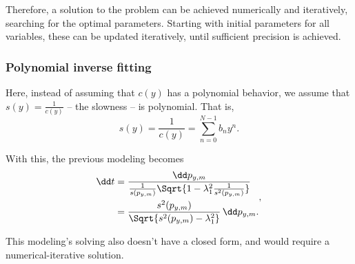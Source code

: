Therefore, a solution to the problem can be achieved numerically and iteratively, searching for the optimal parameters. Starting with initial parameters for all variables, these can be updated iteratively, until sufficient precision is achieved.

\subsubsection{Polynomial inverse fitting}

Here, instead of assuming that $c(y)$ has a polynomial behavior, we assume that $s(y) = \frac{1}{c(y)}$ -- the slowness -- is polynomial. That is,
\begin{equation}
	s(y) = \frac{1}{c(y)} = \sum_{n=0}^{N-1} b_n y^n.
	\label{eq:sec2:polynomial_slowness}
\end{equation}

With this, the previous modeling becomes
\begin{equation}
	\begin{split}
		\dd t
		& = \frac{\dd p_{y,m}}{\frac{1}{s(p_{y,m})} \Sqrt{1-\lambda_1^2\frac{1}{s^2(p_{y,m})}}}\\
		& = \frac{s^2(p_{y,m})}{\Sqrt{s^2(p_{y,m}) - \lambda_1^2}} \, \dd p_{y,m}.
	\end{split},
\end{equation}

This modeling's solving also doesn't have a closed form, and would require a numerical-iterative solution.
